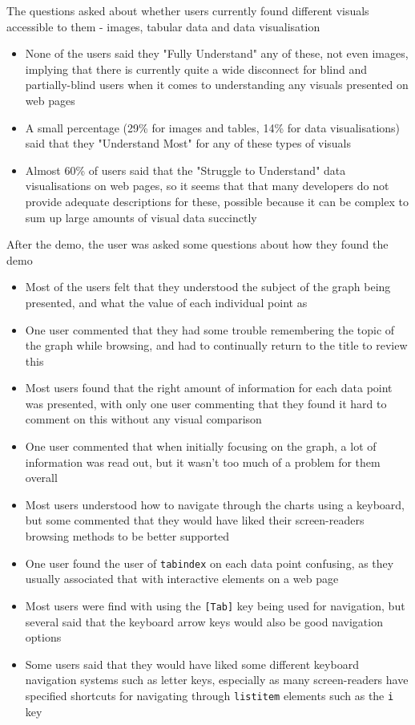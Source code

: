\documentclass[ %
                    author={Aleena Baig},
                supervisor={Dr Simon Lock},
                    degree={BSc},
                     title={On Making Web Accessible Graphs},
                  subtitle={},
                      year={2019} ]{dissertation}
\begin{document}
The questions asked about whether users currently found different visuals accessible to them - images, tabular data and data visualisation

\begin{itemize}
    \item None of the users said they "Fully Understand" any of these, not even images, implying that there is currently quite a wide disconnect for blind and partially-blind users when it comes to understanding any visuals presented on web pages
    \item A small percentage (29\% for images and tables, 14\% for data visualisations) said that they "Understand Most" for any of these types of visuals
    \item Almost 60\% of users said that the "Struggle to Understand" data visualisations on web pages, so it seems that that many developers do not provide adequate descriptions for these, possible because it can be complex to sum up large amounts of visual data succinctly
\end{itemize}

After the demo, the user was asked some questions about how they found the demo

\begin{itemize}
    \item Most of the users felt that they understood the subject of the graph being presented, and what the value of each individual point as
    \item One user commented that they had some trouble remembering the topic of the graph while browsing, and had to continually return to the title to review this
    \item Most users found that the right amount of information for each data point was presented, with only one user commenting that they found it hard to comment on this without any visual comparison
    \item One user commented that when initially focusing on the graph, a lot of information was read out, but it wasn't too much of a problem for them overall
    \item Most users understood how to navigate through the charts using a keyboard, but some commented that they would have liked their screen-readers browsing methods to be better supported
    \item One user found the user of \texttt{tabindex} on each data point confusing, as they usually associated that with interactive elements on a web page
    \item Most users were find with using the \texttt{[Tab]} key being used for navigation, but several said that the keyboard arrow keys would also be good navigation options
    \item Some users said that they would have liked some different keyboard navigation systems such as letter keys, especially as many screen-readers have specified shortcuts for navigating through \texttt{listitem} elements such as the \texttt{i} key
\end{itemize}
\end{document}
